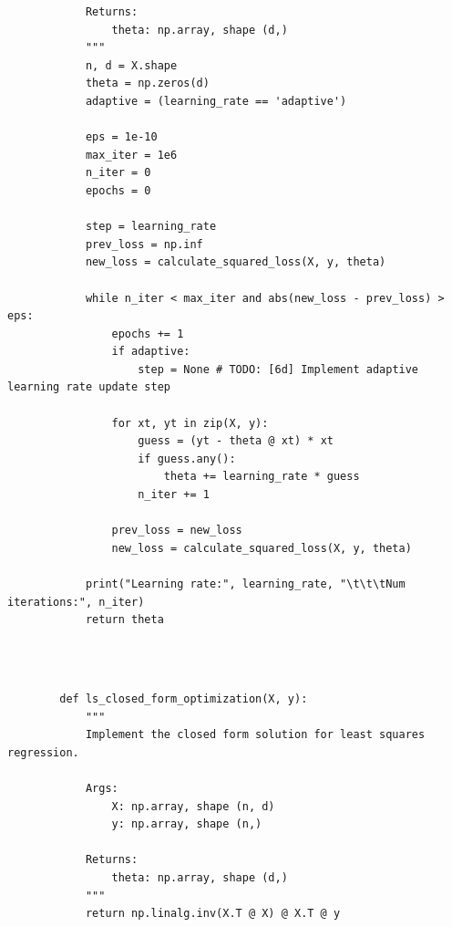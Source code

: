 \documentclass[12pt, letterpaper]{article}
\renewcommand{\t}[1]{\text{#1}}
\begin{document}
\begin{solution}{}
\begin{verbatim}
            Returns:
                theta: np.array, shape (d,)
            """
            n, d = X.shape
            theta = np.zeros(d)
            adaptive = (learning_rate == 'adaptive')

            eps = 1e-10
            max_iter = 1e6
            n_iter = 0
            epochs = 0

            step = learning_rate
            prev_loss = np.inf
            new_loss = calculate_squared_loss(X, y, theta)

            while n_iter < max_iter and abs(new_loss - prev_loss) > eps:
                epochs += 1
                if adaptive:
                    step = None # TODO: [6d] Implement adaptive learning rate update step 

                for xt, yt in zip(X, y):
                    guess = (yt - theta @ xt) * xt
                    if guess.any():
                        theta += learning_rate * guess
                    n_iter += 1

                prev_loss = new_loss
                new_loss = calculate_squared_loss(X, y, theta)

            print("Learning rate:", learning_rate, "\t\t\tNum iterations:", n_iter)
            return theta
        
        \end{verbatim}
        \phantom{text}\\
        \begin{verbatim}
        def ls_closed_form_optimization(X, y):
            """
            Implement the closed form solution for least squares regression.

            Args:
                X: np.array, shape (n, d) 
                y: np.array, shape (n,)

            Returns:
                theta: np.array, shape (d,)
            """
            return np.linalg.inv(X.T @ X) @ X.T @ y
        \end{verbatim}
\end{solution}
\end{document}
